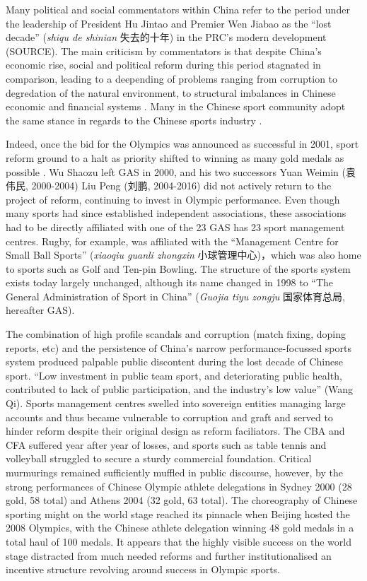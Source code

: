 {Many political and social commentators within China refer to the period under the leadership of President Hu Jintao and Premier Wen Jiabao as the ``lost decade'' (\textit{shiqu de shinian} 失去的十年) in the PRC's modern development (SOURCE). The main criticism by commentators is that despite China's economic rise, social and political reform during this period stagnated in comparison, leading to a deepending of problems ranging from corruption to degredation of the natural environment, to structural imbalances in Chinese economic and financial systems \citep{Barme2014}.  Many in the Chinese sport community adopt the same stance in regards to the Chinese sports industry \citep{News2017}.

Indeed, once the bid for the Olympics was announced as successful in 2001, sport reform ground to a halt as priority shifted to winning as many gold medals as possible \citep{News2017}.  Wu Shaozu left GAS in 2000, and his two successors Yuan Weimin (袁伟民, 2000-2004) Liu Peng (刘鹏, 2004-2016) did not actively return to the project of reform, continuing to invest in Olympic performance.  Even though many sports had since established independent associations, these associations had to be directly affiliated with one of the 23 GAS has 23 sport management centres. Rugby, for example, was affiliated with the ``Management Centre for Small Ball Sports'' (\textit{xiaoqiu guanli zhongxin} 小球管理中心)，which was also home to sports such as Golf and Ten-pin Bowling.  The structure of the sports system exists today largely unchanged, although its name changed in 1998 to ``The General Administration of Sport in China'' (\textit{Guojia tiyu zongju} 国家体育总局, hereafter GAS).

The combination of high profile scandals and corruption (match fixing, doping reports, etc) and the persistence of China's narrow performance-focussed sports system produced palpable public discontent during the lost decade of Chinese sport. ``Low investment in public team sport, and deteriorating public health, contributed to lack of public participation, and the industry’s low value'' (Wang Qi). Sports management centres swelled into sovereign entities managing large accounts and thus became vulnerable to corruption and graft and served to hinder reform despite their original design as reform faciliators. The CBA and CFA suffered year after year of losses, and sports such as table tennis and volleyball struggled to secure a sturdy commercial foundation. Critical murmurings remained sufficiently muffled in public discourse, however, by the strong performances of Chinese Olympic athlete delegations in Sydney 2000 (28 gold, 58 total) and Athens 2004 (32 gold, 63 total). The choreography of Chinese sporting might on the world stage reached its pinnacle when Beijing hosted the 2008 Olympics, with the Chinese athlete delegation winning 48 gold medals in a total haul of 100 medals.  It appears that the highly visible success on the world stage distracted from much needed reforms and further institutionalised an incentive structure revolving around success in Olympic sports.

}
